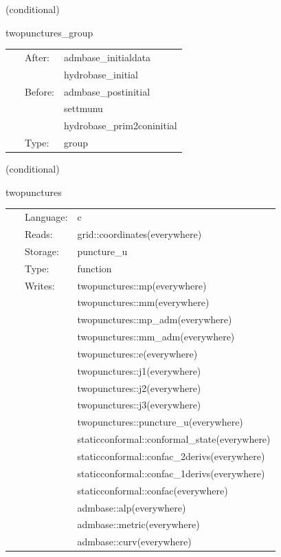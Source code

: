    (conditional) 

\hspace{5mm} twopunctures\_group 

\hspace{5mm}{\it twopunctures initial data group } 


\hspace{5mm}

 \begin{tabular*}{160mm}{cll} 
~ & After:  & admbase\_initialdata \\ 
~& ~ &hydrobase\_initial\\ 
~ & Before:  & admbase\_postinitial \\ 
~& ~ &settmunu\\ 
~& ~ &hydrobase\_prim2coninitial\\ 
~ & Type:  & group \\ 
\end{tabular*} 


\vspace{5mm}

   (conditional) 

\hspace{5mm} twopunctures 

\hspace{5mm}{\it create puncture black hole initial data } 


\hspace{5mm}

 \begin{tabular*}{160mm}{cll} 
~ & Language:  & c \\ 
~ & Reads:  & grid::coordinates(everywhere) \\ 
~ & Storage:  & puncture\_u \\ 
~ & Type:  & function \\ 
~ & Writes:  & twopunctures::mp(everywhere) \\ 
~& ~ &twopunctures::mm(everywhere)\\ 
~& ~ &twopunctures::mp\_adm(everywhere)\\ 
~& ~ &twopunctures::mm\_adm(everywhere)\\ 
~& ~ &twopunctures::e(everywhere)\\ 
~& ~ &twopunctures::j1(everywhere)\\ 
~& ~ &twopunctures::j2(everywhere)\\ 
~& ~ &twopunctures::j3(everywhere)\\ 
~& ~ &twopunctures::puncture\_u(everywhere)\\ 
~& ~ &staticconformal::conformal\_state(everywhere)\\ 
~& ~ &staticconformal::confac\_2derivs(everywhere)\\ 
~& ~ &staticconformal::confac\_1derivs(everywhere)\\ 
~& ~ &staticconformal::confac(everywhere)\\ 
~& ~ &admbase::alp(everywhere)\\ 
~& ~ &admbase::metric(everywhere)\\ 
~& ~ &admbase::curv(everywhere)\\ 
\end{tabular*} 


